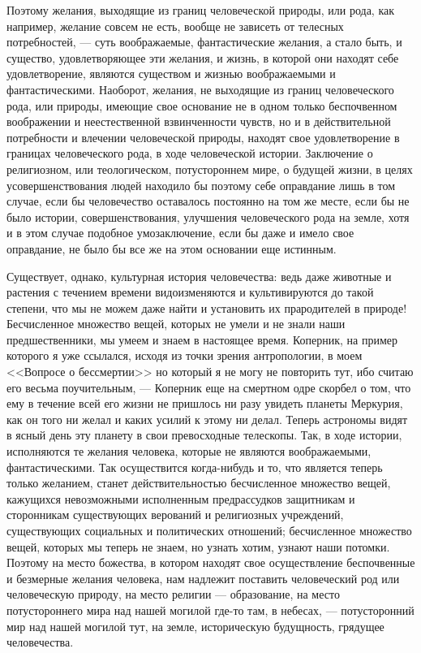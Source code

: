 \documentclass[12pt]{article}
\begin{document}
Поэтому желания, выходящие из границ человеческой природы, или рода, как например, желание совсем не есть, вообще не зависеть от телесных потребностей, --- суть воображаемые, фантастические желания, а стало быть, и существо, удовлетворяющее эти желания, и жизнь, в которой они находят себе удовлетворение, являются существом и жизнью воображаемыми и фантастическими. Наоборот, желания, не выходящие из границ человеческого рода, или природы, имеющие свое основание не в одном только беспочвенном воображении и неестественной взвинченности чувств, но и в действительной потребности и влечении человеческой природы, находят свое удовлетворение в границах человеческого рода, в ходе человеческой истории. Заключение о религиозном, или теологическом, потустороннем мире, о будущей жизни, в целях усовершенствования людей находило бы поэтому себе оправдание лишь в том случае, если бы человечество оставалось постоянно на том же месте, если бы не было истории, совершенствования, улучшения человеческого рода на земле, хотя и в этом случае подобное умозаключение, если бы даже и имело свое оправдание, не было бы все же на этом основании еще истинным. 

Существует, однако, культурная история человечества: ведь даже животные и растения с течением времени видоизменяются и культивируются до такой степени, что мы не можем даже найти и установить их прародителей в природе! Бесчисленное множество вещей, которых не умели и не знали наши предшественники, мы умеем и знаем в настоящее время. Коперник, на пример которого я уже ссылался, исходя из точки зрения антропологии, в моем <<Вопросе о бессмертии>>  но который я не могу не повторить тут, ибо считаю его весьма поучительным, --- Коперник еще на смертном одре скорбел о том, что ему в течение всей его жизни не пришлось ни разу увидеть планеты Меркурия, как он того ни желал и каких усилий к этому ни делал. Теперь астрономы видят в ясный день эту планету в свои превосходные телескопы. Так, в ходе истории, исполняются те желания человека, которые не являются воображаемыми, фантастическими. Так осуществится когда-нибудь и то, что является теперь только желанием, станет действительностью бесчисленное множество вещей, кажущихся невозможными исполненным предрассудков защитникам и сторонникам существующих верований и религиозных учреждений, существующих социальных и политических отношений; бесчисленное множество вещей, которых мы теперь не знаем, но узнать хотим, узнают наши потомки. Поэтому на место божества, в котором находят свое осуществление беспочвенные и безмерные желания человека, нам надлежит поставить человеческий род или человеческую природу, на место религии --- образование, на место потустороннего мира над нашей могилой где-то там, в небесах, --- потусторонний мир над нашей могилой тут, на земле, историческую будущность, грядущее человечества. 
\end{document}
